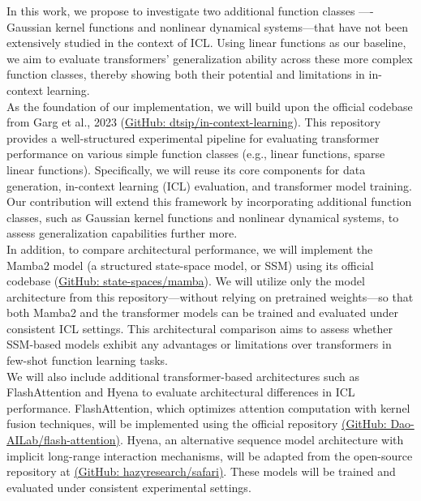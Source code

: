 In this work, we propose to investigate two additional function classes —- Gaussian kernel functions and nonlinear dynamical systems—that have not been extensively studied in the context of ICL. Using linear functions as our baseline, we aim to evaluate transformers’ generalization ability across these more complex function classes, thereby showing both their potential and limitations in in-context learning.
\\
As the foundation of our implementation, we will build upon the official codebase from Garg et al., 2023\cite{garg2023transformerslearnincontextcase} (\href{https://github.com/dtsip/in-context-learning}{GitHub: dtsip/in-context-learning}). This repository provides a well-structured experimental pipeline for evaluating transformer performance on various simple function classes (e.g., linear functions, sparse linear functions). Specifically, we will reuse its core components for data generation, in-context learning (ICL) evaluation, and transformer model training. Our contribution will extend this framework by incorporating additional function classes, such as Gaussian kernel functions and nonlinear dynamical systems, to assess generalization capabilities further more.
\\
In addition, to compare architectural performance, we will implement the Mamba2 model (a structured state-space model, or SSM) using its official codebase (\href{https://github.com/state-spaces/mamba}{GitHub: state-spaces/mamba}). We will utilize only the model architecture from this repository—without relying on pretrained weights—so that both Mamba2 and the transformer models can be trained and evaluated under consistent ICL settings. This architectural comparison aims to assess whether SSM-based models exhibit any advantages or limitations over transformers in few-shot function learning tasks.
\\
We will also include additional transformer-based architectures such as FlashAttention and Hyena to evaluate architectural differences in ICL performance. FlashAttention, which optimizes attention computation with kernel fusion techniques, will be implemented using the official repository \href{https://github.com/Dao-AILab/flash-attention}{(GitHub: Dao-AILab/flash-attention)}. Hyena, an alternative sequence model architecture with implicit long-range interaction mechanisms, will be adapted from the open-source repository at \href{https://github.com/hazyresearch/safari}{(GitHub: hazyresearch/safari)}. These models will be trained and evaluated under consistent experimental settings.

